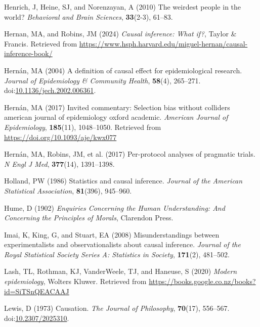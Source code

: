 \documentclass[
  single column]{article}
\newlength{\cslhangindent}
\newenvironment{CSLReferences}[2] %
 {\begin{list}{}{%
  \setlength{\itemindent}{0pt}
  \setlength{\leftmargin}{0pt}
  \setlength{\parsep}{0pt}
  \ifodd #1
   \setlength{\leftmargin}{\cslhangindent}
   \setlength{\itemindent}{-1\cslhangindent}
  \fi
  \setlength{\itemsep}{#2\baselineskip}}}
 {\end{list}}
\begin{document}
\begin{CSLReferences}{1}{0}
Henrich, J, Heine, SJ, and Norenzayan, A (2010) The weirdest people in
the world? \emph{Behavioral and Brain Sciences}, \textbf{33}(2-3),
61--83.

Hernan, MA, and Robins, JM (2024) \emph{Causal inference: What if?},
Taylor \& Francis. Retrieved from
\url{https://www.hsph.harvard.edu/miguel-hernan/causal-inference-book/}

Hernán, MA (2004) A definition of causal effect for epidemiological
research. \emph{Journal of Epidemiology \& Community Health},
\textbf{58}(4), 265--271.
doi:\href{https://doi.org/10.1136/jech.2002.006361}{10.1136/jech.2002.006361}.

Hernán, MA (2017) Invited commentary: Selection bias without colliders
\textbar{} american journal of epidemiology \textbar{} oxford academic.
\emph{American Journal of Epidemiology}, \textbf{185}(11), 1048--1050.
Retrieved from \url{https://doi.org/10.1093/aje/kwx077}

Hernán, MA, Robins, JM, et al. (2017) Per-protocol analyses of pragmatic
trials. \emph{N Engl J Med}, \textbf{377}(14), 1391--1398.

Holland, PW (1986) Statistics and causal inference. \emph{Journal of the
American Statistical Association}, \textbf{81}(396), 945--960.

Hume, D (1902) \emph{Enquiries Concerning the Human Understanding: And
Concerning the Principles of Morals}, Clarendon Press.

Imai, K, King, G, and Stuart, EA (2008) Misunderstandings between
experimentalists and observationalists about causal inference.
\emph{Journal of the Royal Statistical Society Series A: Statistics in
Society}, \textbf{171}(2), 481--502.

Lash, TL, Rothman, KJ, VanderWeele, TJ, and Haneuse, S (2020)
\emph{Modern epidemiology}, Wolters Kluwer. Retrieved from
\url{https://books.google.co.nz/books?id=SiTSnQEACAAJ}

Lewis, D (1973) Causation. \emph{The Journal of Philosophy},
\textbf{70}(17), 556--567.
doi:\href{https://doi.org/10.2307/2025310}{10.2307/2025310}.


\end{CSLReferences}
\end{document}
